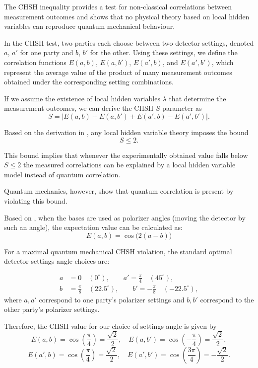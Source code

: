 The CHSH inequality provides a test for non-classical correlations between measurement outcomes and shows that no physical theory based on local hidden variables can reproduce quantum mechanical behaviour.

In the CHSH test, two parties each choose between two detector settings, denoted $a$, $a'$ for one party and $b$, $b'$ for the other. Using these settings, we define the correlation functions $E(a,b)$, $E(a,b')$, $E(a',b)$, and $E(a',b')$, which represent the average value of the product of many measurement outcomes obtained under the corresponding setting combinations.

If we assume the existence of local hidden variables $\lambda$ that determine the measurement outcomes, we can derive the CHSH $S$-parameter \cite{Clauser1969CHSH} as
\[
S = \left|E(a, b) + E(a, b') + E(a', b) - E(a', b')\right|.
\]

Based on the derivation in \cite{Clauser1969CHSH}, any local hidden variable theory imposes the bound
\[
S \le 2.
\]

This bound implies that whenever the experimentally obtained value falls below $S \le 2$ the measured correlations can be explained by a local hidden variable model instead of quantum correlation.

Quantum mechanics, however, show that quantum correlation is present by violating this bound. 

Based on \cite{vanHee2026}, when the bases are used as polarizer angles (moving the detector by such an angle), the expectation value can be calculated as:
\[
E(a,b) = \cos\big(2(a-b)\big)
\]

For a maximal quantum mechanical CHSH violation, the standard optimal detector settings angle choices are:

\begin{align*}
a &= 0 \quad (0^\circ), \qquad a' = \frac{\pi}{4} \quad (45^\circ), \\
b &= \frac{\pi}{8} \quad (22.5^\circ), \qquad b' = -\frac{\pi}{8} \quad (-22.5^\circ),
\end{align*}
where $a, a'$ correspond to one party's polarizer settings and $b, b'$ correspond to the other party's polarizer settings. 


\noindent Therefore, the CHSH value for our choice of settings angle is given by
\[
E(a,b)=\cos\left(\frac{\pi}{4}\right)=\frac{\sqrt{2}}{2}, \quad
E(a,b')=\cos\left(-\frac{\pi}{4}\right)=\frac{\sqrt{2}}{2},
\]
\[
E(a',b)=\cos\left(\frac{\pi}{4}\right)=\frac{\sqrt{2}}{2}, \quad
E(a',b')=\cos\left(\frac{3\pi}{4}\right)=-\frac{\sqrt{2}}{2}.   
\]

